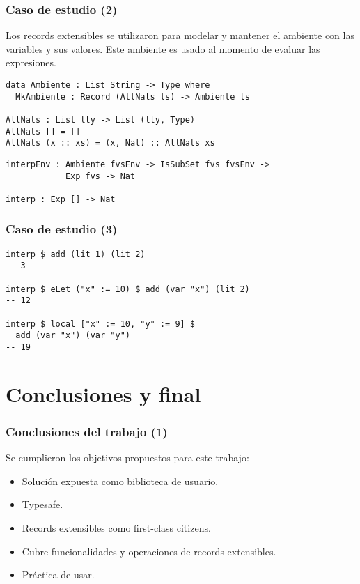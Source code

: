 \documentclass{beamer}
\begin{document}
\begin{frame}[fragile]
\frametitle{Caso de estudio (2)}

Los records extensibles se utilizaron para modelar y mantener el ambiente con las variables y sus valores. Este ambiente es usado al momento de evaluar las expresiones.

\begin{definition}
\begin{verbatim}
data Ambiente : List String -> Type where
  MkAmbiente : Record (AllNats ls) -> Ambiente ls

AllNats : List lty -> List (lty, Type)
AllNats [] = []
AllNats (x :: xs) = (x, Nat) :: AllNats xs
\end{verbatim}
\end{definition}

\begin{definition}
\begin{verbatim}
interpEnv : Ambiente fvsEnv -> IsSubSet fvs fvsEnv -> 
            Exp fvs -> Nat

interp : Exp [] -> Nat
\end{verbatim}
\end{definition}
\end{frame}

\begin{frame}[fragile]
\frametitle{Caso de estudio (3)}

\begin{example}
\begin{verbatim}
interp $ add (lit 1) (lit 2)
-- 3

interp $ eLet ("x" := 10) $ add (var "x") (lit 2)
-- 12

interp $ local ["x" := 10, "y" := 9] $ 
  add (var "x") (var "y")
-- 19
\end{verbatim}
\end{example}

\end{frame}

\section{Conclusiones y final}

\begin{frame}
\frametitle{Conclusiones del trabajo (1)}

Se cumplieron los objetivos propuestos para este trabajo:

\begin{itemize}
\item Solución expuesta como biblioteca de usuario.
\item Typesafe.
\item Records extensibles como first-class citizens.
\item Cubre funcionalidades y operaciones de records extensibles.
\item Práctica de usar.
\end{itemize}

\end{frame}
\end{document}
